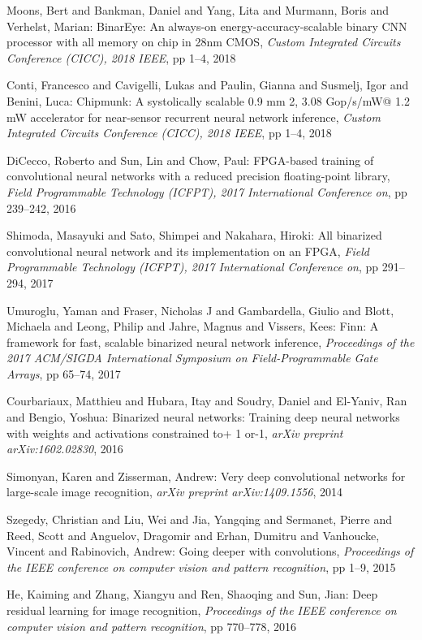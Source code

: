 \documentclass[techrep,english]{ipsj} %
\begin{document}
\begin{thebibliography}{99}
  Moons, Bert and Bankman, Daniel and Yang, Lita and Murmann, Boris and Verhelst, Marian:
  BinarEye: An always-on energy-accuracy-scalable binary CNN processor with all memory on chip in 28nm CMOS,
  {\it Custom Integrated Circuits Conference (CICC), 2018 IEEE},
  pp 1–4, 2018


  Conti, Francesco and Cavigelli, Lukas and Paulin, Gianna and Susmelj, Igor and Benini, Luca:
  Chipmunk: A systolically scalable 0.9 mm 2, 3.08 Gop/s/mW@ 1.2 mW accelerator for near-sensor recurrent neural network inference,
  {\it Custom Integrated Circuits Conference (CICC), 2018 IEEE},
  pp 1–4, 2018

  DiCecco, Roberto and Sun, Lin and Chow, Paul:
  FPGA-based training of convolutional neural networks with a reduced precision floating-point library,
  {\it  Field Programmable Technology (ICFPT), 2017 International Conference on},
  pp 239–242, 2016

  Shimoda, Masayuki and Sato, Shimpei and Nakahara, Hiroki:
  All binarized convolutional neural network and its implementation on an FPGA,
  {\it  Field Programmable Technology (ICFPT), 2017 International Conference on},
  pp 291–294, 2017

  Umuroglu, Yaman and Fraser, Nicholas J and Gambardella, Giulio and Blott, Michaela and Leong, Philip and Jahre, Magnus and Vissers, Kees:
  Finn: A framework for fast, scalable binarized neural network inference,
  {\it  Proceedings of the 2017 ACM/SIGDA International Symposium on Field-Programmable Gate Arrays},
  pp 65–74, 2017


  Courbariaux, Matthieu and Hubara, Itay and Soudry, Daniel and El-Yaniv, Ran and Bengio, Yoshua:
  Binarized neural networks: Training deep neural networks with weights and activations constrained to+ 1 or-1,
  {\it arXiv preprint arXiv:1602.02830},
  2016

  Simonyan, Karen and Zisserman, Andrew:
  Very deep convolutional networks for large-scale image recognition,
  {\it arXiv preprint arXiv:1409.1556},
  2014

  Szegedy, Christian and Liu, Wei and Jia, Yangqing and Sermanet, Pierre and Reed, Scott and Anguelov, Dragomir and Erhan, Dumitru and Vanhoucke, Vincent and Rabinovich, Andrew:
  Going deeper with convolutions,
  {\it Proceedings of the IEEE conference on computer vision and pattern recognition},
  pp 1--9, 2015

  He, Kaiming and Zhang, Xiangyu and Ren, Shaoqing and Sun, Jian:
  Deep residual learning for image recognition,
  {\it Proceedings of the IEEE conference on computer vision and pattern recognition},
  pp 770--778, 2016
    
\end{thebibliography}  
\end{document}

